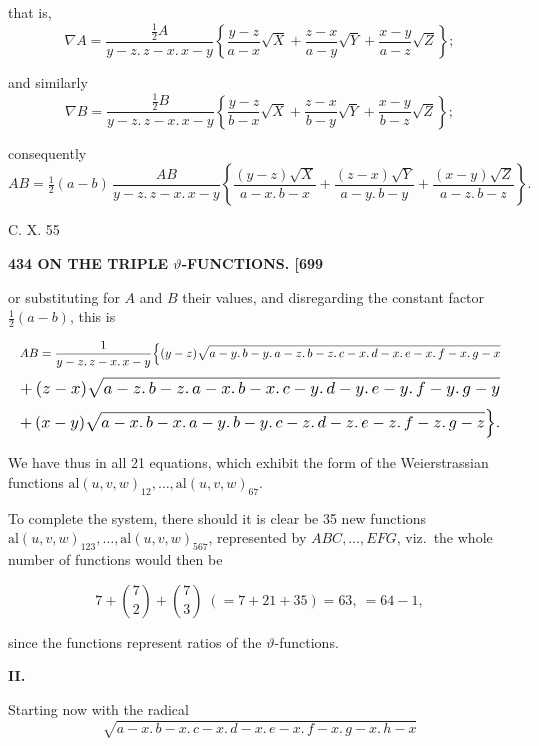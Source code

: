 \documentclass[11pt]{article}
\begin{document}
that is,
\[
\nabla A = \frac{\tfrac{1}{2}A}{y-z.\,z-x.\,x-y}\left\{\frac{y-z}{a-x}\sqrt{X} + \frac{z-x}{a-y}\sqrt{Y} + \frac{x-y}{a-z}\sqrt{Z}\right\};
\]

and similarly
\[
\nabla B = \frac{\tfrac{1}{2}B}{y-z.\,z-x.\,x-y}\left\{\frac{y-z}{b-x}\sqrt{X} + \frac{z-x}{b-y}\sqrt{Y} + \frac{x-y}{b-z}\sqrt{Z}\right\};
\]

consequently
\[
AB = \tfrac{1}{2}(a-b)\,\frac{AB}{y-z.\,z-x.\,x-y}\left\{\frac{(y-z)\sqrt{X}}{a-x.\,b-x} + \frac{(z-x)\sqrt{Y}}{a-y.\,b-y} + \frac{(x-y)\sqrt{Z}}{a-z.\,b-z}\right\}.
\]

\hfill C. X. \hfill 55

\bigskip
\noindent\textbf{434 \hfill ON THE TRIPLE $\vartheta$-FUNCTIONS. \hfill [699}

\medskip

or substituting for $A$ and $B$ their values, and disregarding the constant factor $\tfrac{1}{2}(a-b)$, this is

\[
\resizebox{\textwidth}{!}{$\displaystyle
AB = \frac{1}{y-z.\,z-x.\,x-y}\Bigl\{(y-z)\sqrt{a-y.\,b-y.\,a-z.\,b-z.\,c-x.\,d-x.\,e-x.\,f-x.\,g-x}\Bigr.
$}
\]
\[
\resizebox{\textwidth}{!}{$\displaystyle
+\,(z-x)\sqrt{a-z.\,b-z.\,a-x.\,b-x.\,c-y.\,d-y.\,e-y.\,f-y.\,g-y}
$}
\]
\[
\resizebox{\textwidth}{!}{$\displaystyle
\Bigl. +\,(x-y)\sqrt{a-x.\,b-x.\,a-y.\,b-y.\,c-z.\,d-z.\,e-z.\,f-z.\,g-z}\Bigr\}.
$}
\]

We have thus in all 21 equations, which exhibit the form of the Weierstrassian functions $\mathrm{al}(u, v, w)_{12}, \ldots, \mathrm{al}(u, v, w)_{67}$.

To complete the system, there should it is clear be 35 new functions $\mathrm{al}(u, v, w)_{123}, \ldots, \mathrm{al}(u, v, w)_{567}$, represented by $ABC, \ldots, EFG$, viz.\ the whole number of functions would then be

\[
7 + \binom{7}{2} + \binom{7}{3}\;(= 7 + 21 + 35) = 63,\ = 64 - 1,
\]

since the functions represent ratios of the $\vartheta$-functions.

\medskip
\begin{center}\textbf{II.}\end{center}

Starting now with the radical
\[
\sqrt{a-x.\,b-x.\,c-x.\,d-x.\,e-x.\,f-x.\,g-x.\,h-x}
\]
\end{document}
